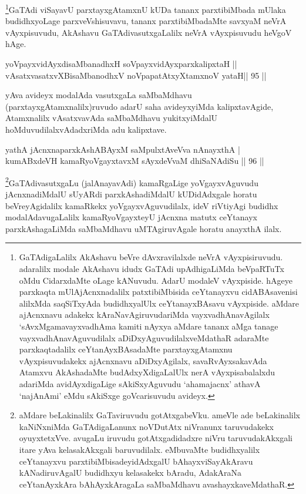 \begin{artha}
\footnote{GaTAdigaLalilx AkAshavu beVre dAvxravilalxde neVrA vAyxpisiruvudu. adaralilx modale AkAshavu idudx GaTAdi upAdhigaLiMda beVpaRTuTx oMdu CidarxdaMte oLage kANuvudu. AdarU modaleV vAyxpiside. hAgeye parxkaqta mUlAjAcnxnadalilx patxtibiMbisida ceYtanayxvu cidABAsavenisi alilxMda saqSiTxyAda budidhxyalUlx ceYtanayxBAsavu vAyxpiside. aMdare ajAcnxnavu adakekx kAraNavAgiruvudariMda vayxvadhAnavAgilalx `sAvxMgamavayxvadhAma kamiti nAyxya aMdare tananx aMga tanage vayxvadhAnavAguvudilalx aDiDxyAguvudilalxveMdathaR adaraMte parxkaqtadalilx ceYtanAyxBAsadaMte parxtayxgAtamxnu vAyxpisuvudakekx ajAcnxnavu aDiDxyAgilalx, savaRvAyxsakavAda Atamxvu AkAshadaMte budAdxyXdigaLalUlx nerA vAyxpisabalalxdu adariMda avidAyxdigaLige sAkiSxyAguvudu `ahamajacnx' athavA `najAnAmi' eMdu sAkiSxge goVcarisuvudu avideyx.}GaTAdi viSayavU parxtayxgAtamxnU kUDa tananx parxtibiMbada mUlaka budidhxyoLage parxveVshisuvavu, tananx parxtibiMbadaMte savxyaM neVrA vAyxpisuvudu, AkAshavu GaTAdivasutxgaLalilx neVrA vAyxpisuvudu heVgoV hAge.
\end{artha}

\begin{shl}
yoV\s payxvidAyxdisaMbanadhxH soV\s payxvidAyxparxkalipxtaH ||  \\
vAsatxvasatxvXBisaMbanodhxV noVpapatAtxyX\s \s tamxnoV yataH\hfill ||  95 ||  
\end{shl}

\begin{artha}
yAva avideyx modalAda vasutxgaLa saMbaMdhavu (parxtayxgAtamxnalilx)ruvudo adarU saha avideyxyiMda kalipxtavAgide, Atamxnalilx vAsatxvavAda saMbaMdhavu yukitxyiMdalU hoMduvudilalxvAdadxriMda adu kalipxtave.
\end{artha}


\begin{shl}
yathA jAcnxnaparxkAshABAyxM saMpulxtAveVva nAnayxthA | \\
kumABxdeVH kamaRyoVgayxtavxM sAyxdeVvaM dhiSaNAdiSu \hfill||  96 || 
\end{shl}

\begin{artha}
\footnote{aMdare beLakinalilx GaTaviruvudu gotAtxgabeVku. ameVle ade beLakinalilx kaNiNxniMda GaTAdigaLanunx noVDutAtx niVranunx taruvudakekx oyuyxtetxVve. avugaLu iruvudu gotAtxgadidadxre niVru taruvudakAkxgali itare yAva kelasakAkxgali baruvudilalx. eMbuvaMte budidhxyalilx ceYtanayxvu parxtibiMbisadeyidAdxgalU bAhayxviSayAkAravu kANadiruvAgalU budidhxyu kelasakekx bAradu, AdakAraNa ceYtanAyxkAra bAhAyxkAragaLa saMbaMdhavu avashayxkaveMdathaR.}GaTAdivasutxgaLu (jalAnayavAdi) kamaRgaLige yoVgayxvAguvudu jAcnxnadiMdalU sUyARdi parxkAshadiMdalU kUDidAdxgale horatu beVreyAgidalilx kamaRkekx yoVgayxvAguvudilalx, ideV riVtiyAgi budidhx modalAdavugaLalilx kamaRyoVgayxteyU jAcnxna matutx ceYtanayx parxkAshagaLiMda saMbaMdhavu uMTAgiruvAgale horatu anayxthA ilalx.
\end{artha}

